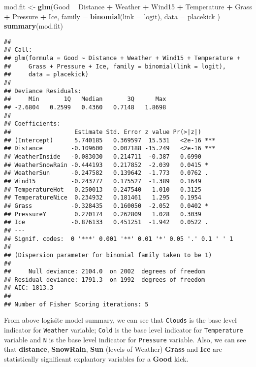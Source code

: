 \documentclass[]{article}
\newenvironment{Shaded}{\begin{snugshade}}{\end{snugshade}}
\newcommand{\DataTypeTok}[1]{\textcolor[rgb]{0.13,0.29,0.53}{#1}}
\newcommand{\KeywordTok}[1]{\textcolor[rgb]{0.13,0.29,0.53}{\textbf{#1}}}
\newcommand{\NormalTok}[1]{#1}
\newcommand{\OperatorTok}[1]{\textcolor[rgb]{0.81,0.36,0.00}{\textbf{#1}}}
\newcommand{\StringTok}[1]{\textcolor[rgb]{0.31,0.60,0.02}{#1}}
\begin{document}
\begin{Shaded}
\begin{Highlighting}[]
\NormalTok{mod.fit <-}\StringTok{ }\KeywordTok{glm}\NormalTok{(Good }\OperatorTok{~}\StringTok{ }\NormalTok{Distance }\OperatorTok{+}\StringTok{ }\NormalTok{Weather }\OperatorTok{+}\StringTok{ }\NormalTok{Wind15 }\OperatorTok{+}\StringTok{ }\NormalTok{Temperature }\OperatorTok{+}\StringTok{ }\NormalTok{Grass }\OperatorTok{+}\StringTok{ }\NormalTok{Pressure }\OperatorTok{+}\StringTok{ }\NormalTok{Ice, }\DataTypeTok{family =} \KeywordTok{binomial}\NormalTok{(}\DataTypeTok{link =}\NormalTok{ logit), }\DataTypeTok{data =}\NormalTok{ placekick )}
\KeywordTok{summary}\NormalTok{(mod.fit)}
\end{Highlighting}
\end{Shaded}

\begin{verbatim}
## 
## Call:
## glm(formula = Good ~ Distance + Weather + Wind15 + Temperature + 
##     Grass + Pressure + Ice, family = binomial(link = logit), 
##     data = placekick)
## 
## Deviance Residuals: 
##     Min       1Q   Median       3Q      Max  
## -2.6804   0.2599   0.4360   0.7148   1.8698  
## 
## Coefficients:
##                  Estimate Std. Error z value Pr(>|z|)    
## (Intercept)      5.740185   0.369597  15.531   <2e-16 ***
## Distance        -0.109600   0.007188 -15.249   <2e-16 ***
## WeatherInside   -0.083030   0.214711  -0.387   0.6990    
## WeatherSnowRain -0.444193   0.217852  -2.039   0.0415 *  
## WeatherSun      -0.247582   0.139642  -1.773   0.0762 .  
## Wind15          -0.243777   0.175527  -1.389   0.1649    
## TemperatureHot   0.250013   0.247540   1.010   0.3125    
## TemperatureNice  0.234932   0.181461   1.295   0.1954    
## Grass           -0.328435   0.160050  -2.052   0.0402 *  
## PressureY        0.270174   0.262809   1.028   0.3039    
## Ice             -0.876133   0.451251  -1.942   0.0522 .  
## ---
## Signif. codes:  0 '***' 0.001 '**' 0.01 '*' 0.05 '.' 0.1 ' ' 1
## 
## (Dispersion parameter for binomial family taken to be 1)
## 
##     Null deviance: 2104.0  on 2002  degrees of freedom
## Residual deviance: 1791.3  on 1992  degrees of freedom
## AIC: 1813.3
## 
## Number of Fisher Scoring iterations: 5
\end{verbatim}

From above logisitc model summary, we can see that \texttt{Clouds} is
the base level indicator for \texttt{Weather} variable; \texttt{Cold} is
the base level indicator for \texttt{Temperature} variable and
\texttt{N} is the base level indicator for \texttt{Pressure} variable.
Also, we can see that \textbf{distance}, \textbf{SnowRain}, \textbf{Sun}
(levels of Weather) \textbf{Grass} and \textbf{Ice} are statistically
significant explantory variables for a \textbf{Good} kick.
\end{document}
